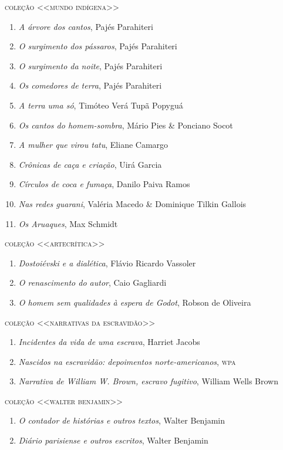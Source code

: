 \medskip
{\large\textsc{coleção <<mundo indígena>>}}

\begin{enumerate}
\setlength\parskip{4.2pt}
\setlength\itemsep{-1.4mm}
\item \textit{A árvore dos cantos}, Pajés Parahiteri
\item \textit{O surgimento dos pássaros}, Pajés Parahiteri
\item \textit{O surgimento da noite}, Pajés Parahiteri
\item \textit{Os comedores de terra}, Pajés Parahiteri
\item \textit{A terra uma só}, Timóteo Verá Tupã Popyguá
\item \textit{Os cantos do homem-sombra}, Mário Pies \& Ponciano Socot
\item \textit{A mulher que virou tatu}, Eliane Camargo
\item \textit{Crônicas de caça e criação}, Uirá Garcia
\item \textit{Círculos de coca e fumaça}, Danilo Paiva Ramos
\item \textit{Nas redes guarani}, Valéria Macedo \& Dominique Tilkin Gallois
\item \textit{Os Aruaques}, Max Schmidt
\end{enumerate}

\medskip
{\large\textsc{coleção <<artecrítica>>}}

\begin{enumerate}
\setlength\parskip{4.2pt}
\setlength\itemsep{-1.4mm}
\item \textit{Dostoiévski e a dialética}, Flávio Ricardo Vassoler
\item \textit{O renascimento do autor}, Caio Gagliardi
\item \textit{O homem sem qualidades à espera de Godot}, Robson de Oliveira
\end{enumerate}

\medskip
{\large\textsc{coleção <<narrativas da escravidão>>}}

\begin{enumerate}
\setlength\parskip{4.2pt}
\setlength\itemsep{-1.4mm}
\item \textit{Incidentes da vida de uma escrava}, Harriet Jacobs
\item \textit{Nascidos na escravidão: depoimentos norte-americanos}, \textsc{wpa}
\item \textit{Narrativa de William W. Brown, escravo fugitivo}, William Wells Brown
\end{enumerate}

\medskip
{\large\textsc{coleção <<walter benjamin>>}}

\begin{enumerate}
\setlength\parskip{4.2pt}
\setlength\itemsep{-1.4mm}
\item \textit{O contador de histórias e outros textos}, Walter Benjamin
\item \textit{Diário parisiense e outros escritos}, Walter Benjamin
\end{enumerate}

\pagebreak